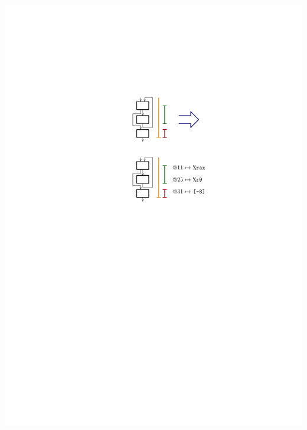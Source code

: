 \documentclass[navbaroff,en]{sdqbeamer}
\begin{document}
\begin{frame}
\begin{columns}
	\begin{column}{0.35\textwidth}
		\centering \includegraphics[scale=0.7]{images/allocation.pdf}
	\end{column}
\end{columns}
\end{frame}
\end{document}
